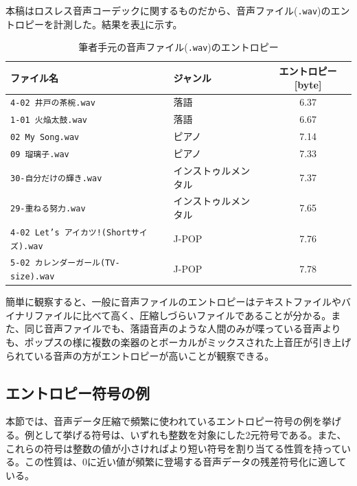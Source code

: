 \documentclass[uplatex,dvipdfmx,b5j,10pt]{jsbook}
\theoremstyle{definition}
\begin{document}
本稿はロスレス音声コーデックに関するものだから、音声ファイル(\texttt{.wav})のエントロピーを計測した。結果を表\ref{wavs_8bitentropy}に示す。
\begin{table}[htbp]
  \begin{center}
    \caption{筆者手元の音声ファイル(\texttt{.wav})のエントロピー} \label{wavs_8bitentropy}
    \begin{tabular}{|l|l|c|}
      \hline
      ファイル名 & ジャンル & エントロピー[byte]                        \\ \hline
      \texttt{4-02 井戸の茶椀.wav}  & 落語 & 6.37               \\ \hline
      \texttt{1-01 火焔太鼓.wav}    & 落語 & 6.67               \\ \hline
      \texttt{02 My Song.wav}       & ピアノ   & 7.14               \\ \hline
      \texttt{09 瑠璃子.wav}        & ピアノ   & 7.33               \\ \hline
      \texttt{30-自分だけの輝き.wav} & インストゥルメンタル & 7.37  \\ \hline
      \texttt{29-重ねる努力.wav}     & インストゥルメンタル & 7.65  \\ \hline
      \texttt{4-02 Let's アイカツ!(Shortサイズ).wav} & J-POP & 7.76 \\ \hline
      \texttt{5-02 カレンダーガール(TV-size).wav} & J-POP & 7.78    \\ \hline
    \end{tabular}
  \end{center}
\end{table}

簡単に観察すると、一般に音声ファイルのエントロピーはテキストファイルやバイナリファイルに比べて高く、圧縮しづらいファイルであることが分かる。また、同じ音声ファイルでも、落語音声のような人間のみが喋っている音声よりも、ポップスの様に複数の楽器のとボーカルがミックスされた上音圧が引き上げられている音声の方がエントロピーが高いことが観察できる。

\subsection{エントロピー符号の例}

本節では、音声データ圧縮で頻繁に使われているエントロピー符号の例を挙げる。例として挙げる符号は、いずれも整数を対象にした2元符号である。また、これらの符号は整数の値が小さければより短い符号を割り当てる性質を持っている。この性質は、0に近い値が頻繁に登場する音声データの残差符号化に適している。
\end{document}
